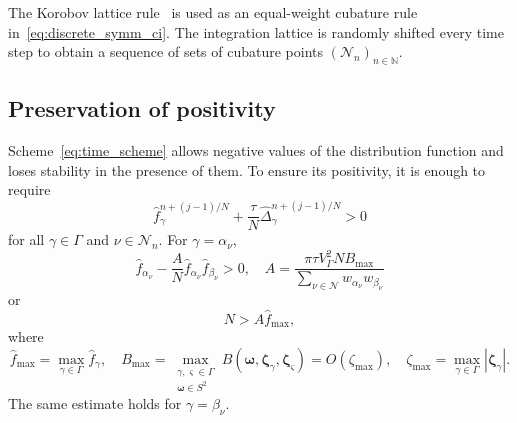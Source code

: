 \documentclass[10pt]{article}
\newcommand{\bzeta}{\boldsymbol{\zeta}}
\newcommand{\Nu}{\mathcal{N}}
\newcommand{\OO}[1]{O(#1)}
\begin{document}
The Korobov lattice rule~\cite{Korobov1959, Sloan1994} is used as
an equal-weight cubature rule in~\eqref{eq:discrete_symm_ci}.
The integration lattice is randomly shifted every time step
to obtain a sequence of sets of cubature points \((\Nu_n)_{n\in\mathbb{N}}\).

\subsection{Preservation of positivity}

Scheme~\eqref{eq:time_scheme} allows negative values of the distribution function
and loses stability in the presence of them.
To ensure its positivity, it is enough to require
\begin{equation}\label{eq:positive_f}
    \hat{f}_\gamma^{n+(j-1)/N} + \frac{\tau}N \hat{\Delta}_\gamma^{n+(j-1)/N} > 0
\end{equation}
for all \(\gamma\in\Gamma\) and \(\nu\in\Nu_n\).
For \(\gamma = \alpha_\nu\),
\begin{equation}\label{eq:positive_f_alpha}
    \hat{f}_{\alpha_\nu} - \frac{A}{N}\hat{f}_{\alpha_\nu}\hat{f}_{\beta_\nu} > 0, \quad
    A = \frac{\pi\tau V_\Gamma^2 N B_{\max}}{\sum_{\nu\in\Nu} w_{\alpha_\nu}w_{\beta_\nu}}
\end{equation}
or
\begin{equation}\label{eq:positive_f_alpha2}
    N > A \hat{f}_{\max},
\end{equation}
where
\begin{equation}\label{eq:f_B_max}
    \hat{f}_{\max} = \max_{\gamma\in\Gamma} \hat{f}_\gamma, \quad
    B_{\max} = \max_{\substack{\gamma,\varsigma\in\Gamma\\\boldsymbol{\omega}\in S^2}}
        B(\boldsymbol{\omega}, \bzeta_{\gamma}, \bzeta_{\varsigma}) = \OO{\zeta_{\max}}, \quad
    \zeta_{\max} = \max_{\gamma\in\Gamma}|\bzeta_\gamma|.
\end{equation}
The same estimate holds for \(\gamma = \beta_\nu\).
\end{document}
